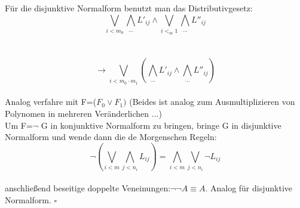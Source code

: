 \documentclass[a4paper]{scrartcl}
\begin{document}
Für die disjunktive Normalform benutzt man das Distributivgesetz:\\
$$\bigvee\limits_{i<m_0}\bigwedge\limits_{...}L'_{ij} \land \bigvee\limits_{i<_m1}\bigwedge\limits_{...} L''_{ij}$$\\ \\
$$\rightarrow \bigvee\limits_{i< m_0\cdot m_1} ( \bigwedge\limits_{...} L'_{ij} \land \bigwedge\limits_{...} L''_{ij})$$\\
Analog verfahre mit F=($F_0\lor F_1)$ (Beides ist analog zum Ausmultiplizieren von Polynomen in mehreren Veränderlichen ...)\\
Um F=$\neg$ G in konjunktive Normalform zu bringen, bringe G in disjunktive Normalform und wende dann die de Morgenschen Regeln:\\
$$\neg (\bigvee\limits_{i<m}\bigwedge\limits_{j<n_i}L_{ij})=\bigwedge\limits_{i<m}\bigvee\limits_{j<n_i} \neg L_{ij}$$\\
anschließend beseitige doppelte Veneinungen:$\neg\neg A\equiv A$. Analog für disjunktive Normalform. $\square$
\end{document}
